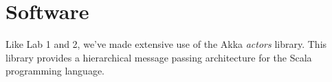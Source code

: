 \documentclass[11pt]{article}
\begin{document}

\section{Software}
Like Lab 1 and 2, we've made extensive use of the Akka \emph{actors}
library.  This library provides a hierarchical message passing
architecture for the Scala programming language.
\end{document}
